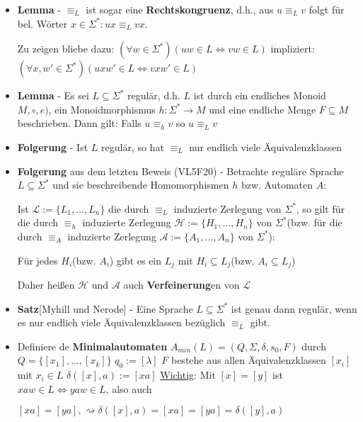 \documentclass[12pt, a4paper]{article}
\begin{document}
\begin{itemize}
		\item \textbf{Lemma} - $\equiv_{L}$ ist sogar eine \textbf{Rechtskongruenz}, d.h., aus $u\equiv_{L}v$ folgt für bel. Wörter $x\in\Sigma^{*}:ux\equiv_{L}vx$.
		
		\subitem Zu zeigen bliebe dazu: $(\forall w\in\Sigma^{*})(uw\in L\Leftrightarrow vw\in L)$ impliziert: $(\forall x,w'\in\Sigma^{*})(uxw'\in L\Leftrightarrow vxw'\in L)$
		
		\item \textbf{Lemma} - Es sei $L\subseteq\Sigma^{*}$ regulär, d.h. $L$ ist durch ein endliches Monoid $M,\circ,e)$, ein Monoidmorphismus $h:\Sigma^{*}\rightarrow M$ und eine endliche Menge $F\subseteq M$ beschrieben. Dann gilt: Falls $u\equiv_{h}v$ so $u\equiv_{L}v$
		
		\item \textbf{Folgerung} - Ist $L$ regulär, so hat $\equiv_{L}$ nur endlich viele Äquivalenzklassen
		
		\item \textbf{Folgerung} aus dem letzten Beweis (VL5F20) - Betrachte reguläre Sprache $L\subseteq\Sigma^{*}$ und sie beschreibende Homomorphismen $h$ bzw. Automaten $A$:
		
		\subitem Ist $\mathcal{L}:=\{L_{1},\dots,L_{n}\}$ die durch $\equiv_{L}$ induzierte Zerlegung von $\Sigma^{*}$, so gilt für die durch $\equiv_{h}$ induzierte Zerlegung $\mathcal{H}:=\{H_{1},\dots,H_{n}\}$ von $\Sigma^{*}$(bzw. für die durch $\equiv_{A}$ induzierte Zerlegung $\mathcal{A}:=\{A_{1},\dots,A_{n}\}$ von $\Sigma^{*}$):
		
		\subitem Für jedes $H_{i}$(bzw. $A_{i}$) gibt es ein $L_{j}$ mit $H_{i}\subseteq L_{j}$(bzw. $A_{i}\subseteq L_{j}$)
		
		\subitem Daher heißen $\mathcal{H}$ und $\mathcal{A}$ auch \textbf{Verfeinerung}en von $\mathcal{L}$
		
		\item \textbf{Satz}[Myhill und Nerode] - Eine Sprache $L\subseteq\Sigma^{*}$ ist genau dann regulär, wenn es nur endlich viele Äquivalenzklassen bezüglich $\equiv_{L}$ gibt.
		
		\item Definiere de \textbf{Minimalautomaten} $A_{min}(L)=(Q,\Sigma,\delta,s_{0},F)$ durch 
		\subitem $Q=\{[x_{1}],...,[x_{k}]\}$
		\subitem $q_{0}:=[\lambda]$
		\subitem $F$ bestehe aus allen Äquivalenzklassen $[x_{i}]$ mit $x_{i}\in L$
		\subitem $\delta([x],a):=[xa]$
		\subitem \underline{Wichtig}: Mit $[x]=[y]$ ist $xaw\in L\Leftrightarrow yaw\in L$, also auch
		\begin{center}
			$[xa]=[ya], \rightsquigarrow \delta([x],a) = [xa] = [ya] = \delta([y],a)$
		\end{center} 
		

\end{itemize}
\end{document}

